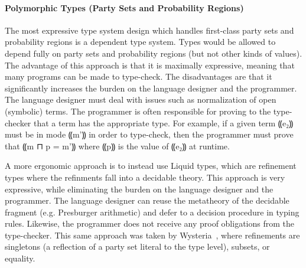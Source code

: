 \paragraph*{Polymorphic Types (Party Sets and Probability Regions)}

The most expressive type system design which handles first-class party sets
and probability regions is a dependent type system. Types would be allowed to
depend fully on party sets and probability regions (but not other kinds of values).
The advantage of this approach is that it is maximally expressive, meaning that
many programs can be made to type-check. The disadvantages are that it significantly
increases the burden on the language designer and the programmer. The language designer
must deal with issues such as normalization of open (symbolic) terms. The programmer
is often responsible for proving to the type-checker that a term has the appropriate type.
For example, if a given term ⸨e₂⸩ must be in mode ⸨m'⸩ in order to type-check, then the
programmer must prove that ⸨m ⊓ p = m'⸩ where ⸨p⸩ is the value of ⸨e₂⸩ at runtime.

A more ergonomic approach is to instead use Liquid types, which are refinement types
where the refinments fall into a decidable theory. This approach is very expressive,
while eliminating the burden on the language designer and the programmer. The language
designer can reuse the metatheory of the decidable fragment (e.g. Presburger arithmetic)
and defer to a decision procedure in typing rules. Likewise, the programmer does not receive
any proof obligations from the type-checker. This same approach was taken by Wysteria~\cite{todo},
where refinements are singletons (a reflection of a party set literal to the type level),
subsets, or equality.


 \\

\begin{theorem}[PMTO\%]\label{thm:lang-pmto}
\end{theorem}

 \\

